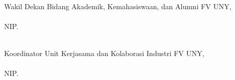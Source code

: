 \begin{minipage}{0.35\textwidth}
    \hfill\\[2em]
    Wakil Dekan Bidang Akademik, Kemahasiswaan, dan Alumni FV UNY,\\[2cm]
    \resizebox{\textwidth}{!}{\wakildekan}\\
    NIP. \NIPwakildekan
\end{minipage}
\hfill
\begin{minipage}{0.47\textwidth}
    \hfill\\[2em]
    Koordinator Unit Kerjasama dan Kolaborasi Industri {\prodi} FV UNY,\\[2cm]
    \resizebox{\textwidth}{!}{\koordinatorUKKI}\\
    NIP. \NIPkoordinatorUKKI
\end{minipage}%

